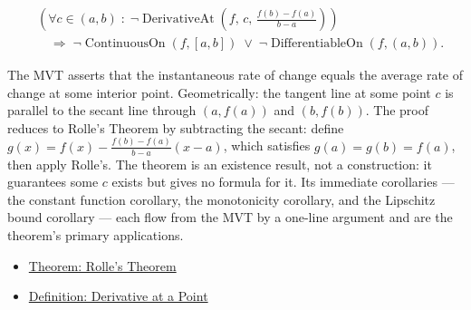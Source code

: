 \begin{remark*}
\begin{align*}
&\left(\forall c\in(a,b)\;:\;\neg\operatorname{DerivativeAt}\!\left(f,\,c,\,\tfrac{f(b)-f(a)}{b-a}\right)\right)\\
&\quad\Longrightarrow\;
\neg\operatorname{ContinuousOn}(f,[a,b])
\;\lor\;
\neg\operatorname{DifferentiableOn}(f,(a,b)).
\end{align*}
\end{remark*}

\begin{remark*}[Interpretation]
The MVT asserts that the instantaneous rate of change equals the average rate of change at some interior point. Geometrically: the tangent line at some point $c$ is parallel to the secant line through $(a,f(a))$ and $(b,f(b))$. The proof reduces to Rolle's Theorem by subtracting the secant: define $g(x) = f(x) - \tfrac{f(b)-f(a)}{b-a}(x-a)$, which satisfies $g(a)=g(b)=f(a)$, then apply Rolle's. The theorem is an existence result, not a construction: it guarantees some $c$ exists but gives no formula for it. Its immediate corollaries --- the constant function corollary, the monotonicity corollary, and the Lipschitz bound corollary --- each flow from the MVT by a one-line argument and are the theorem's primary applications.
\end{remark*}

\begin{dependencies}
\begin{itemize}
  \item \hyperref[thm:rolles-theorem]{Theorem: Rolle's Theorem}
  \item \hyperref[def:derivative-at-a-point]{Definition: Derivative at a Point}
\end{itemize}
\end{dependencies}
